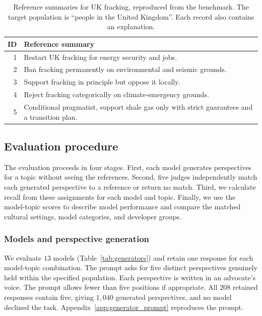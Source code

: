 \documentclass[11pt,a4paper]{article}
\begin{document}
\begin{table}[t]
\centering\small
\caption{Reference summaries for UK fracking, reproduced from the benchmark. The target population is ``people in the United Kingdom''. Each record also contains an explanation.}
\label{tab:reference-example}
\begin{tabularx}{\columnwidth}{@{}rY@{}}
\toprule
ID & Reference summary \\
 & Restart UK fracking for energy security and jobs. \\
2 & Ban fracking permanently on environmental and seismic grounds. \\
3 & Support fracking in principle but oppose it locally. \\
4 & Reject fracking categorically on climate-emergency grounds. \\
5 & Conditional pragmatist, support shale gas only with strict guarantees and a transition plan. \\
\bottomrule
\end{tabularx}
\end{table}

\subsection{Evaluation procedure}
\label{sec:evaluation}
The evaluation proceeds in four stages. First, each model generates perspectives for a topic without seeing the references. Second, five judges independently match each generated perspective to a reference or return no match. Third, we calculate recall from these assignments for each model and topic. Finally, we use the model-topic scores to describe model performance and compare the matched cultural settings, model categories, and developer groups.

\subsubsection{Models and perspective generation}
\label{sec:perspective-generation}
We evaluate $13$ models (Table~\ref{tab:generators}) and retain one response for each model-topic combination. The prompt asks for five distinct perspectives genuinely held within the specified population. Each perspective is written in an advocate's voice. The prompt allows fewer than five positions if appropriate. All $208$ retained responses contain five, giving $1{,}040$ generated perspectives, and no model declined the task. Appendix~\ref{app:generator_prompt} reproduces the prompt.
\end{document}
